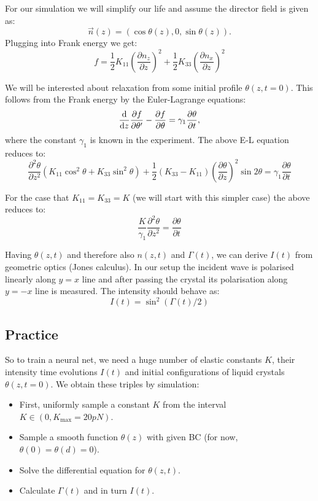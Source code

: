 \documentclass{article}
\begin{document}
For our simulation we will simplify our life and assume the director field is given as:
\begin{equation*}
\vec{n}(z) = ( \cos \theta(z) , 0, \sin \theta(z) ).
\end{equation*}
Plugging into Frank energy we get:
\begin{equation*}
f = \frac{1}{2} K_{11} \left( \frac{\partial n_z}{\partial z} \right)^2 + \frac{1}{2} K_{33} \left( \frac{\partial n_x}{\partial z} \right)^2 
\end{equation*}

We will be interested about relaxation from some initial profile $\theta(z, t=0)$. This follows from the Frank energy by the Euler-Lagrange equations:
\begin{equation*}
\frac{\textup{d}}{\textup{d}z} \frac{\partial f}{\partial \theta^\prime} - \frac{\partial f}{\partial \theta} = \gamma_1 \frac{\partial \theta}{\partial t},
\end{equation*}
where the constant $\gamma_1$ is known in the experiment. The above E-L equation reduces to:
\begin{equation*}
\frac{\partial^2 \theta}{\partial z^2} (K_{11} \cos^2 \theta + K_{33} \sin^2 \theta ) + \frac{1}{2} (K_{33}-K_{11}) \left( \frac{\partial \theta}{\partial z } \right)^2 \sin 2 \theta = \gamma_1 \frac{\partial \theta}{\partial t}
\end{equation*}

For the case that $K_{11}=K_{33}=K$ (we will start with this simpler case) the above reduces to:
\begin{equation*}
\frac{K}{\gamma_1} \frac{\partial^2 \theta}{\partial z^2} = \frac{\partial \theta}{\partial t}
\end{equation*}

Having $\theta(z,t)$ and therefore also $n(z,t)$ and $\Gamma(t)$, we can derive $I(t)$ from geometric optics (Jones calculus). In our setup the incident wave is polarised linearly along $y=x$ line and after passing the crystal its polarisation along $y=-x$ line is measured. The intensity should behave as:
\begin{equation*}
I(t)  = \sin^2 (\Gamma(t)/2)
\end{equation*} 

\subsection*{Practice}
So to train a neural net, we need a huge number of elastic constants $K$, their intensity time evolutions $I(t)$ and initial configurations of liquid crystals $\theta(z,t=0)$.
We obtain these triples by simulation:
\begin{itemize}
\item First, uniformly sample a constant $K$ from the interval $K \in (0,K_\mathrm{max} = 20 pN)$.
\item Sample a smooth function $\theta(z)$ with given BC (for now, $\theta(0)=\theta(d) = 0$).
\item Solve the differential equation for $\theta(z,t)$.
\item Calculate $\Gamma(t)$ and in turn $I(t)$.
\end{itemize}
\end{document}
